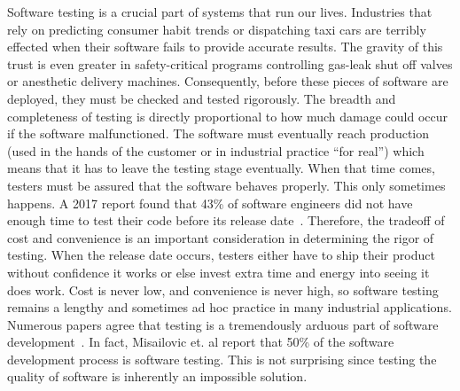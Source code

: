 
Software testing is a crucial part of systems that run our lives. Industries that rely on predicting consumer habit trends or dispatching taxi cars are terribly effected when their software fails to provide accurate results. The gravity of this trust is even greater in safety-critical programs controlling gas-leak shut off valves or anesthetic delivery machines. Consequently, before these pieces of software are deployed, they must be checked and tested rigorously. The breadth and completeness of testing is directly proportional to how much damage could occur if the software malfunctioned. The software must eventually reach production (used in the hands of the customer or in industrial practice ``for real'') which means that it has to leave the testing stage eventually. When that time comes, testers must be assured that the software behaves properly. This only sometimes happens. A 2017 report found that 43\% of software engineers did not have enough time to test their code before its release date~\cite{Kassab-deFranco-Laplante}. Therefore, the tradeoff of cost and convenience is an important consideration in determining the rigor of testing. When the release date occurs, testers either have to ship their product without confidence it works or else invest extra time and energy into seeing it does work. Cost is never low, and convenience is never high, so software testing remains a lengthy and sometimes ad hoc practice in many industrial applications. Numerous papers agree that  testing is a tremendously arduous part of software development~\cite{Murphy:2007:PRT:1292414.1292425,Haller:2010:TDC:1838126.1838132,Muslu:2015:PDE:2771783.2771792,Tiwari:2013:RRT:2439976.2439982,Gupta:2011:MBA:2002931.2002932,Zeller:2017:STS:3105427.3105438,Garousi:2017:IWA:3084226.3084264,Kassab-deFranco-Laplante,Langdon:2017:IAT:3105427.3105429,Goffi:2016:AGO:2931037.2931061}. In fact, Misailovic et. al report that 50\% of the software development process is software testing. This is not surprising since testing the quality of software is inherently an impossible solution.

